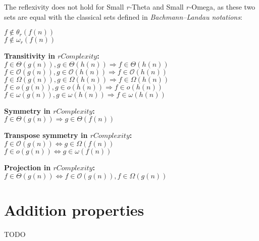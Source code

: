The reflexivity does not hold for Small \textit{r-}Theta and Small \textit{r-}Omega, as these two sets are equal with the classical sets defined in \textit{Bachmann–Landau notations}:
 
$ f \notin \theta_{r}(f(n)) $ \\$ f \notin \omega_{r}(f(n)) $ 
 \hfill\break

 \textbf{Transitivity in $rComplexity$:}  \\  $ f \in \Theta(g(n)),  g \in \Theta(h(n)) \Rightarrow  f \in \Theta(h(n))$ \\
 $ f \in \mathcal{O}(g(n)),  g \in \mathcal{O}(h(n)) \Rightarrow  f \in \mathcal{O}(h(n))$ \\
 $ f \in \Omega(g(n)),  g \in \Omega(h(n)) \Rightarrow  f \in \Omega(h(n))$ \\
 $ f \in o(g(n)),  g \in o(h(n)) \Rightarrow  f \in o(h(n))$ \\
 $ f \in \omega(g(n)),  g \in \omega(h(n)) \Rightarrow  f \in \omega(h(n))$
  \hfill\break

 \textbf{Symmetry in $rComplexity$:}  \\  $ f \in \Theta(g(n)) \Rightarrow g \in \Theta(f(n)) $
 \hfill\break

 \textbf{Transpose symmetry in $rComplexity$:}  \\  $ f \in \mathcal{O}(g(n)) \Leftrightarrow g \in \Omega(f(n)) $
 \\  $ f \in o(g(n)) \Leftrightarrow g \in \omega(f(n)) $
 \hfill\break
 
  \textbf{Projection in $rComplexity$:}  \\  $ f \in \Theta(g(n)) \Leftrightarrow f \in \mathcal{O}(g(n)), f \in \Omega(g(n)) $
 \hfill\break


 
\section{Addition properties}
TODO